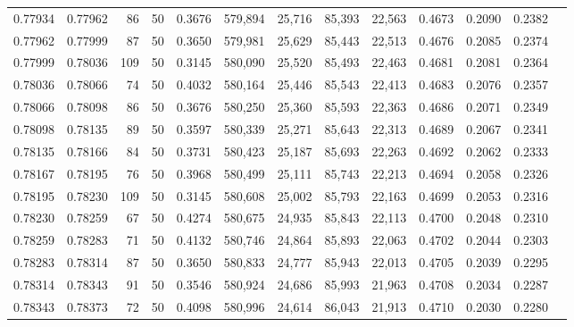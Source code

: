 \begin{tabular}{rrrrrrrrrrrrr}
0.77934 & 0.77962 &    86 &  50 &                                     0.3676 & 579,894 &  25,716 &  85,393 &  22,563 & 0.4673 & 0.2090 & 0.2382 \\
0.77962 & 0.77999 &    87 &  50 &                                     0.3650 & 579,981 &  25,629 &  85,443 &  22,513 & 0.4676 & 0.2085 & 0.2374 \\
0.77999 & 0.78036 &   109 &  50 &                                     0.3145 & 580,090 &  25,520 &  85,493 &  22,463 & 0.4681 & 0.2081 & 0.2364 \\
0.78036 & 0.78066 &    74 &  50 &                                     0.4032 & 580,164 &  25,446 &  85,543 &  22,413 & 0.4683 & 0.2076 & 0.2357 \\
0.78066 & 0.78098 &    86 &  50 &                                     0.3676 & 580,250 &  25,360 &  85,593 &  22,363 & 0.4686 & 0.2071 & 0.2349 \\
0.78098 & 0.78135 &    89 &  50 &                                     0.3597 & 580,339 &  25,271 &  85,643 &  22,313 & 0.4689 & 0.2067 & 0.2341 \\
0.78135 & 0.78166 &    84 &  50 &                                     0.3731 & 580,423 &  25,187 &  85,693 &  22,263 & 0.4692 & 0.2062 & 0.2333 \\
0.78167 & 0.78195 &    76 &  50 &                                     0.3968 & 580,499 &  25,111 &  85,743 &  22,213 & 0.4694 & 0.2058 & 0.2326 \\
0.78195 & 0.78230 &   109 &  50 &                                     0.3145 & 580,608 &  25,002 &  85,793 &  22,163 & 0.4699 & 0.2053 & 0.2316 \\
0.78230 & 0.78259 &    67 &  50 &                                     0.4274 & 580,675 &  24,935 &  85,843 &  22,113 & 0.4700 & 0.2048 & 0.2310 \\
0.78259 & 0.78283 &    71 &  50 &                                     0.4132 & 580,746 &  24,864 &  85,893 &  22,063 & 0.4702 & 0.2044 & 0.2303 \\
0.78283 & 0.78314 &    87 &  50 &                                     0.3650 & 580,833 &  24,777 &  85,943 &  22,013 & 0.4705 & 0.2039 & 0.2295 \\
0.78314 & 0.78343 &    91 &  50 &                                     0.3546 & 580,924 &  24,686 &  85,993 &  21,963 & 0.4708 & 0.2034 & 0.2287 \\
0.78343 & 0.78373 &    72 &  50 &                                     0.4098 & 580,996 &  24,614 &  86,043 &  21,913 & 0.4710 & 0.2030 & 0.2280 \\

\end{tabular}

